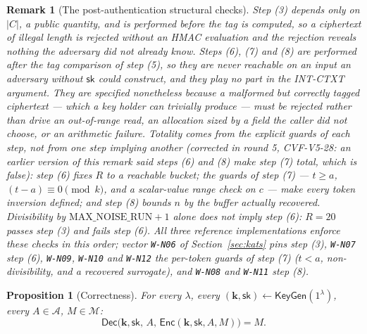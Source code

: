 \documentclass[11pt,a4paper]{article}
\newtheorem{proposition}[theorem]{Proposition}
\newtheorem{remark}[theorem]{Remark}
\begin{document}
\begin{remark}[The post-authentication structural checks]
\label{rem:dec-structural}
Step (3) depends only on $|C|$, a public quantity, and is performed
\emph{before} the tag is computed, so a ciphertext of illegal length is
rejected without an HMAC evaluation and the rejection reveals nothing the
adversary did not already know.
Steps (6), (7) and (8) are performed \emph{after} the tag comparison of
step (5), so they are never reachable on an input an adversary without
$\mathsf{sk}$ could construct, and they play no part in the INT-CTXT
argument. They are specified nonetheless because a malformed but correctly
tagged ciphertext — which a key holder can trivially produce — must be
rejected rather than drive an out-of-range read, an allocation sized by a
field the caller did not choose, or an arithmetic failure. Totality comes
from the explicit guards of each step, not from one step implying another
(corrected in round 5, CVF-V5-28: an earlier version of this remark said
steps (6) and (8) make step (7) total, which is false): step (6) fixes $R$
to a reachable bucket; the guards of step (7) — $t\ge a$,
$(t-a)\equiv0\pmod k$, and a scalar-value range check on $c$ — make every
token inversion defined; and step (8) bounds $n$ by the buffer actually
recovered. Divisibility by $\mathrm{MAX\_NOISE\_RUN}+1$ alone does not imply
step (6): $R=20$ passes step (3) and fails step (6).
All three reference implementations enforce these checks in this order;
vector \texttt{W-N06} of Section~\ref{sec:kats} pins step (3),
\texttt{W-N07} step (6), \texttt{W-N09}, \texttt{W-N10} and \texttt{W-N12}
the per-token guards of step (7) ($t<a$, non-divisibility, and a recovered
surrogate), and \texttt{W-N08} and \texttt{W-N11} step (8).
\end{remark}

\begin{proposition}[Correctness]\label{prop:correctness}
For every $\lambda$, every $(\mathbf{k},\mathsf{sk})\gets\mathsf{KeyGen}(1^\lambda)$,
every $A\in\mathcal{A}$, $M\in\mathcal{M}$:
\[
  \mathsf{Dec}\bigl(\mathbf{k},\mathsf{sk},\,A,\,\mathsf{Enc}(\mathbf{k},\mathsf{sk},A,M)\bigr) = M.
\]
\end{proposition}
\end{document}
